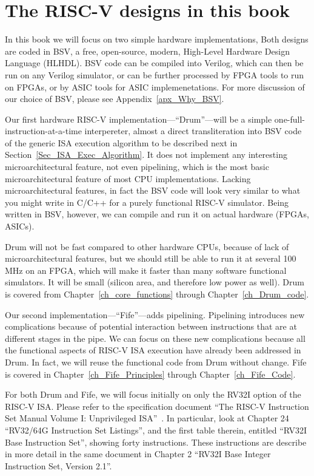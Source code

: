 
\section{The RISC-V designs in this book}

In this book we will focus on two simple hardware implementations,
Both designs are coded in BSV, a free, open-source, modern, High-Level
Hardware Design Language (HLHDL).  BSV code can be compiled into
Verilog, which can then be run on any Verilog simulator, or can be
further processed by FPGA tools to run on FPGAs, or by ASIC tools for
ASIC implemenetations.  For more discussion of our choice of BSV,
please see Appendix~\ref{apx_Why_BSV}.

Our first hardware RISC-V implementation---``Drum''---will be a
simple one-full-instruction-at-a-time interpereter, almost a direct
transliteration into BSV code of the generic ISA execution algorithm
to be described next in Section~\ref{Sec_ISA_Exec_Algorithm}.  It does
not implement any interesting microarchitectural feature, not even
pipelining, which is the most basic microarchitectural feature of most
CPU implementations.  Lacking microarchitectural features, in fact the
BSV code will look very similar to what you might write in C/C++ for a
purely functional RISC-V simulator.  Being written in BSV, however, we
can compile and run it on actual hardware (FPGAs, ASICs).

Drum will not be fast compared to other hardware CPUs, because of lack
of microarchitectural features, but we should still be able to run it
at several 100 MHz on an FPGA, which will make it faster than many
software functional simulators.  It will be small (silicon area, and
therefore low power as well).  Drum is covered from
Chapter~\ref{ch_core_functions} through Chapter~\ref{ch_Drum_code}.

Our second implementation---``Fife''---adds pipelining.  Pipelining
introduces new complications because of potential interaction between
instructions that are at different stages in the pipe.  We can focus
on these new complications because all the functional aspects of
RISC-V ISA execution have already been addressed in Drum.  In fact, we
will reuse the functional code from Drum without change.  Fife is
covered in Chapter~\ref{ch_Fife_Principles} through
Chapter~\ref{ch_Fife_Code}.

For both Drum and Fife, we will focus initially on only the RV32I
option of the RISC-V ISA.  Please refer to the specification document
``The RISC-V Instruction Set Manual Volume I: Unprivileged
ISA''~\cite{RISCV_Unpriv_2019_12_13}.  In particular, look at Chapter
24 ``RV32/64G Instruction Set Listings'', and the first table therein,
entitled ``RV32I Base Instruction Set'', showing forty instructions.
These instructions are describe in more detail in the same document in
Chapter 2 ``RV32I Base Integer Instruction Set, Version 2.1''.

